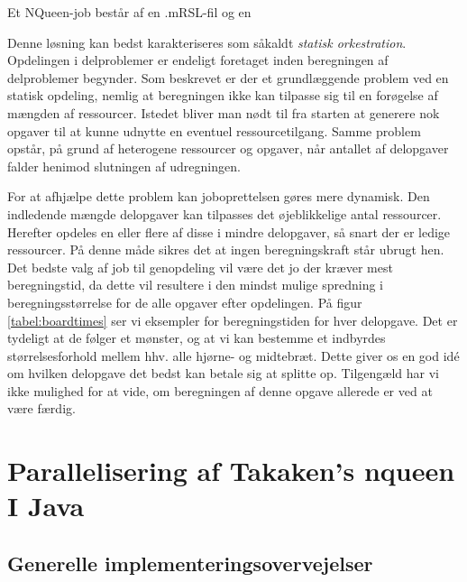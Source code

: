 \documentclass[draft,a4paper,10pt]{article}
\begin{document}

Et NQueen-job består af en .mRSL-fil og en  


Denne løsning kan bedst karakteriseres som såkaldt \emph{statisk orkestration}. Opdelingen i delproblemer er endeligt foretaget inden beregningen af delproblemer begynder. Som beskrevet er der et grundlæggende problem ved en statisk opdeling, nemlig at beregningen ikke kan tilpasse sig til en forøgelse af mængden af ressourcer. Istedet bliver man nødt til fra starten at generere nok opgaver til at kunne udnytte en eventuel ressourcetilgang. Samme problem opstår, på grund af heterogene ressourcer og opgaver, når antallet af delopgaver falder henimod slutningen af udregningen. 

For at afhjælpe dette problem kan joboprettelsen gøres mere dynamisk. Den indledende mængde delopgaver kan tilpasses det øjeblikkelige antal ressourcer. Herefter opdeles en eller flere af disse i mindre delopgaver, så snart der er ledige ressourcer. På denne måde sikres det at ingen beregningskraft står ubrugt hen. 
Det bedste valg af job til genopdeling vil være det jo der kræver mest beregningstid, da dette vil resultere i den mindst mulige spredning i beregningsstørrelse for de alle opgaver efter opdelingen. På figur \ref{tabel:boardtimes} ser vi eksempler for beregningstiden for hver delopgave. Det er tydeligt at de følger et mønster, og at vi kan bestemme et indbyrdes størrelsesforhold mellem hhv. alle hjørne- og midtebræt. Dette giver os en god idé om hvilken delopgave det bedst kan betale sig at splitte op. Tilgengæld har vi ikke mulighed for at vide, om beregningen af denne opgave allerede er ved at være færdig. 

\section{Parallelisering af Takaken's nqueen I Java}

\subsection{Generelle implementeringsovervejelser}
\end{document}
